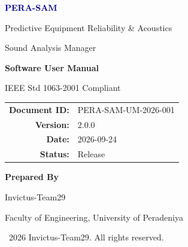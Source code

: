 \documentclass[10pt, a4paper, oneside]{report}
\begin{document}
\begin{titlepage}
  \centering
  \vspace*{1.2cm}

  {\Huge\bfseries\textcolor{darkblue}{PERA-SAM}\par}
  \vspace{0.4cm}
  {\Large\textcolor{codegray}{Predictive Equipment Reliability \& Acoustics}\par}
  {\Large\textcolor{codegray}{Sound Analysis Manager}\par}

  \vspace{1.2cm}

  {\LARGE\bfseries Software User Manual\par}

  \vspace{0.8cm}


  \vspace{0.8cm}

  {\large IEEE Std 1063-2001 Compliant\par}

  \vspace{1.2cm}

  \begin{tabular}{r l}
    \textbf{Document ID:}  & PERA-SAM-UM-2026-001 \\
    \textbf{Version:}      & 2.0.0 \\
    \textbf{Date:}         & 2026-09-24 \\
    \textbf{Status:}       & Release \\
  \end{tabular}

  \vspace{1.2cm}

  {\large\textbf{Prepared By}\par}
  \vspace{0.2cm}
  {\large Invictus-Team29\par}
  {Faculty of Engineering, University of Peradeniya\par}

  \vfill

  {\small \textcopyright\ 2026 Invictus-Team29. All rights reserved.\par}
\end{titlepage}
\end{document}
